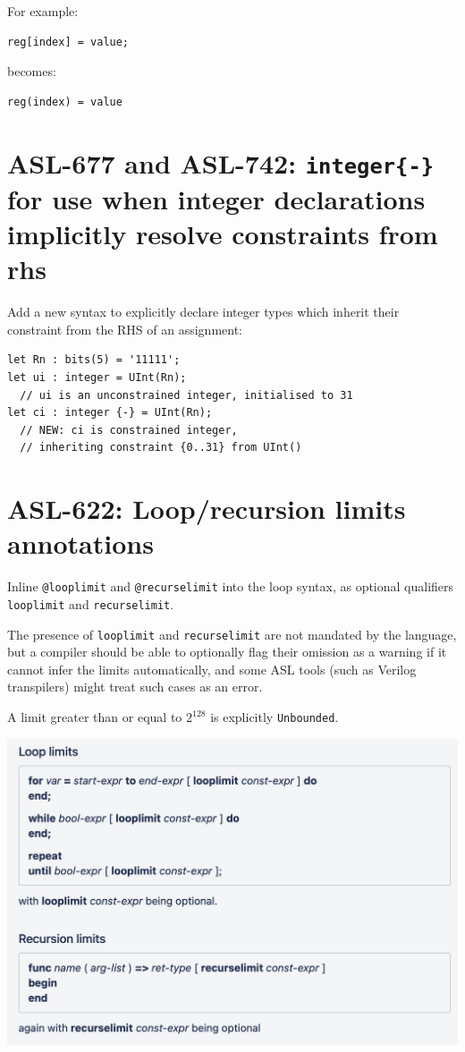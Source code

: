 For example:
\begin{verbatim}
reg[index] = value;
\end{verbatim}

becomes:
\begin{verbatim}
reg(index) = value
\end{verbatim}

\section{ASL-677 and ASL-742: \texttt{integer\{-\}} for use when integer
declarations implicitly resolve constraints from rhs}

Add a new syntax to explicitly declare integer types which inherit their
constraint from the RHS of an assignment:

\begin{verbatim} 
let Rn : bits(5) = '11111';
let ui : integer = UInt(Rn); 
  // ui is an unconstrained integer, initialised to 31
let ci : integer {-} = UInt(Rn); 
  // NEW: ci is constrained integer, 
  // inheriting constraint {0..31} from UInt()
\end{verbatim}

\section{ASL-622: Loop/recursion limits annotations}

Inline \texttt{@looplimit} and \texttt{@recurselimit} into the loop syntax, as
optional qualifiers \texttt{looplimit} and \texttt{recurselimit}.  

The presence of \texttt{looplimit} and \texttt{recurselimit} are not mandated
by the language, but a compiler should be able to optionally flag their
omission as a warning if it cannot infer the limits automatically, and some ASL
tools (such as Verilog transpilers) might treat such cases as an error.

A limit greater than or equal to $2^{128}$ is explicitly \texttt{Unbounded}.


\includegraphics[width=\textwidth]{looprecurselimit.png}

